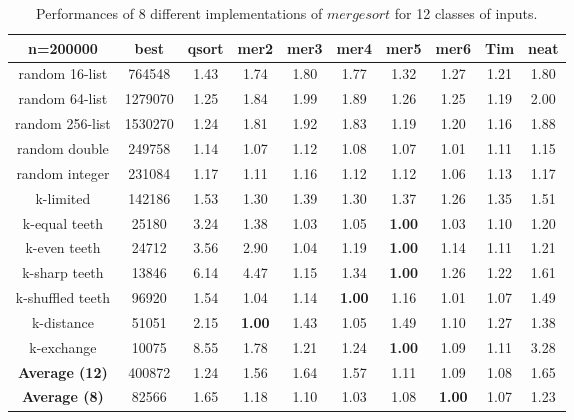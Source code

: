 \documentclass[AMA,STIX1COL]{WileyNJD-v2}
\newcommand{\msort}{$mergesort$ }
\begin{document}
\begin{table}
\caption{Performances of 8 different implementations of \msort for 12 classes of inputs.}
\centering
\begin{tabular}{|c|c|c|c|c|c|c|c|c|c|}
\toprule
n=200000 & best  & qsort & mer2 & mer3 & mer4 & mer5 & mer6 & Tim & neat\\
\midrule
random 16-list	&764548&	1.43&	1.74&	1.80&	1.77&	1.32&	1.27&	1.21&	1.80\\
random 64-list&	1279070&	1.25&	1.84&	1.99&	1.89&	1.26&	1.25&	1.19&	2.00\\
random 256-list&	1530270&	1.24&	1.81&	1.92&	1.83&	1.19&	1.20&	1.16&	1.88\\
random double&	249758&	1.14&	1.07&	1.12&	1.08&	1.07&	1.01&	1.11&	1.15\\
random integer&	231084&	1.17&	1.11&	1.16&	1.12&	1.12&	1.06&	1.13&	1.17\\
k-limited&	142186&	1.53&	1.30&	1.39&	1.30&	1.37&	1.26&	1.35&	1.51\\
k-equal teeth&	25180&	3.24&	1.38&	1.03&	1.05&	\textbf{1.00}&	1.03&	1.10&	1.20\\
k-even teeth&	24712&	3.56&	2.90&	1.04&	1.19&	\textbf{1.00}&	1.14&	1.11&	1.21\\
k-sharp teeth&	13846&	6.14&	4.47&	1.15&	1.34&	\textbf{1.00}&	1.26&	1.22&	1.61\\
k-shuffled teeth&	96920&	1.54&	1.04&	1.14&	\textbf{1.00}&	1.16&	1.01&	1.07&	1.49\\
k-distance&	51051&	2.15&	\textbf{1.00}&	1.43&	1.05&	1.49&	1.10&	1.27&	1.38\\
k-exchange&	10075&	8.55&	1.78&	1.21&	1.24&	\textbf{1.00}&	1.09&	1.11&	3.28\\
\textbf{Average  (12)}&	400872&	1.24&	1.56&	1.64&	1.57&	1.11&	1.09&	1.08&	1.65\\
\textbf{Average  (8)}&	82566&	1.65&	1.18&	1.10&	1.03&	1.08&	\textbf{1.00}&	1.07&	1.23\\

\bottomrule
\end{tabular}
\label{table2}
\end{table}
\end{document}

